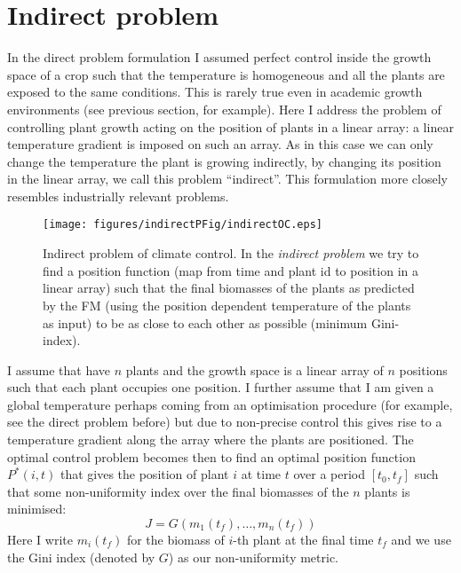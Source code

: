 \section{Indirect problem}
In the direct problem formulation I assumed perfect control inside the growth
space of a crop such that the temperature is homogeneous and all the plants are
exposed to the same conditions. This is rarely true even in academic growth
environments (see previous section, for example). Here I address the problem of
controlling plant growth acting on the position of plants in a linear array: a
linear temperature gradient is imposed on such an array. As in this case we can
only change the temperature the plant is growing indirectly, \ie by changing its
position in the linear array, we call this problem ``indirect''. This
formulation more closely resembles industrially relevant problems.


\begin{figure}
\centering
\texttt{[image: figures/indirectPFig/indirectOC.eps]}
\caption{Indirect problem of climate control. In the \emph{indirect problem} we
  try to find a position function (map from time and plant id to position in a
  linear array) such that the final biomasses of the plants as predicted by the
  FM (using the position dependent temperature of the plants as input) to be as
  close to each other as possible (minimum Gini-index).}
\label{fig:indirectP}
\end{figure}

I assume that have $n$ plants and the growth space is a linear array of $n$
positions such that each plant occupies one position. I further assume that I
am given a global temperature perhaps coming from an optimisation procedure
(for example, see the direct problem before) but due to non-precise control this
gives rise to a temperature gradient along the array where the plants are
positioned. The optimal control problem becomes then to find an optimal position
function $P^*(i, t)$ that gives the position of plant $i$ at time $t$ over a
period $[t_0, t_f]$ such that some non-uniformity index over the final biomasses
of the $n$ plants is minimised:
$$
J = G(m_1(t_f), \dots, m_n(t_f))
$$
Here I write $m_i(t_f)$ for the biomass of $i$-th plant at the final time $t_f$
and we use the Gini index (denoted by $G$) as our non-uniformity metric.


